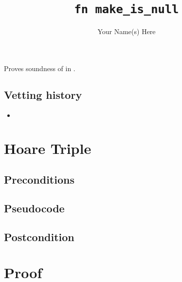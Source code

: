 \documentclass{article} %
\title{\texttt{fn make\_is\_null}}
\author{Your Name(s) Here}\date{}
\begin{document}
\maketitle\contrib
Proves soundness of  in .

\subsection*{Vetting history}
\begin{itemize}
    \item {}
\end{itemize}

\section{Hoare Triple}
\subsection*{Preconditions}
\subsection*{Pseudocode}
\subsection*{Postcondition}

\section{Proof}
\end{document}

